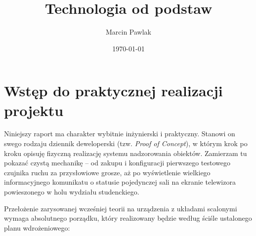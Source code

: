 \documentclass[12pt,a4paper]{article}
\title{Technologia od podstaw}
\author{Marcin Pawlak}
\date{\today}
\begin{document}
\maketitle

\section{Wstęp do praktycznej realizacji projektu}

Niniejszy raport ma charakter wybitnie inżynierski i praktyczny. Stanowi on swego rodzaju dziennik deweloperski (tzw. \textit{Proof of Concept}), w którym krok po kroku opisuję fizyczną realizację systemu nadzorowania obiektów. Zamierzam tu pokazać czystą mechanikę -- od zakupu i konfiguracji pierwszego testowego czujnika ruchu za przysłowiowe grosze, aż po wyświetlenie wielkiego informacyjnego komunikatu o statusie pojedynczej sali na ekranie telewizora powieszonego w holu wydziału studenckiego.

Przełożenie zarysowanej wcześniej teorii na urządzenia z układami scalonymi wymaga absolutnego porządku, który realizowany będzie według ściśle ustalonego planu wdrożeniowego:
\end{document}
